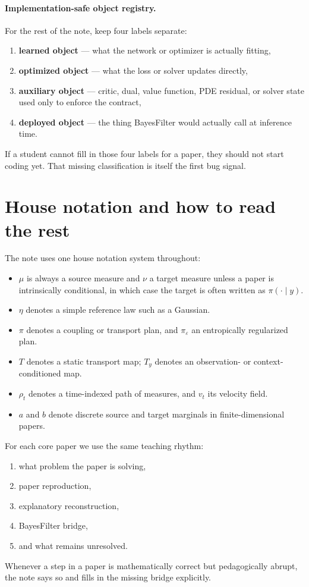 \documentclass[11pt]{report}
\begin{document}
\paragraph{Implementation-safe object registry.}
For the rest of the note, keep four labels separate:
\begin{enumerate}[label=(\roman*)]
  \item \textbf{learned object} --- what the network or optimizer is actually fitting,
  \item \textbf{optimized object} --- what the loss or solver updates directly,
  \item \textbf{auxiliary object} --- critic, dual, value function, PDE residual, or solver state used only to enforce the contract,
  \item \textbf{deployed object} --- the thing BayesFilter would actually call at inference time.
\end{enumerate}
If a student cannot fill in those four labels for a paper, they should not start
coding yet.  That missing classification is itself the first bug signal.

\section{House notation and how to read the rest}

The note uses one house notation system throughout:
\begin{itemize}
  \item $\mu$ is always a source measure and $\nu$ a target measure unless a paper
  is intrinsically conditional, in which case the target is often written as
  $\pi(\cdot\mid y)$.
  \item $\eta$ denotes a simple reference law such as a Gaussian.
  \item $\pi$ denotes a coupling or transport plan, and $\pi_\varepsilon$ an
  entropically regularized plan.
  \item $T$ denotes a static transport map; $T_y$ denotes an observation- or
  context-conditioned map.
  \item $\rho_t$ denotes a time-indexed path of measures, and $v_t$ its velocity
  field.
  \item $a$ and $b$ denote discrete source and target marginals
  in finite-dimensional papers.
\end{itemize}

For each core paper we use the same teaching rhythm:
\begin{enumerate}[label=(\arabic*)]
  \item what problem the paper is solving,
  \item paper reproduction,
  \item explanatory reconstruction,
  \item BayesFilter bridge,
  \item and what remains unresolved.
\end{enumerate}
Whenever a step in a paper is mathematically correct but pedagogically abrupt, the
note says so and fills in the missing bridge explicitly.
\end{document}

